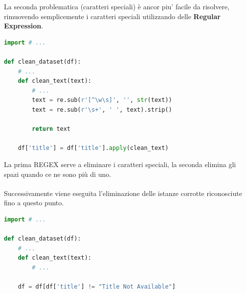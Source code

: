 \documentclass[a4paper,12pt]{report}
\begin{document}
La seconda problematica (caratteri speciali) è ancor piu' facile da risolvere, rimuovendo semplicemente i caratteri speciali utilizzando delle \textbf{Regular Expression}.
\begin{lstlisting}[language=Python]
import # ...

def clean_dataset(df):
    # ...
    def clean_text(text):
        # ...
        text = re.sub(r'[^\w\s]', '', str(text))
        text = re.sub(r'\s+', ' ', text).strip()

        return text

    df['title'] = df['title'].apply(clean_text)
\end{lstlisting}
La prima REGEX serve a eliminare i caratteri speciali, la seconda elimina gli spazi quando ce ne sono più di uno.\\
\\
Successivamente viene eseguita l'eliminazione delle istanze corrotte riconosciute fino a questo punto.
\begin{lstlisting}[language=Python]
import # ...

def clean_dataset(df):
    # ...
    def clean_text(text):
        # ...
    
    df = df[df['title'] != "Title Not Available"]
\end{lstlisting}
\newpage
\end{document}
